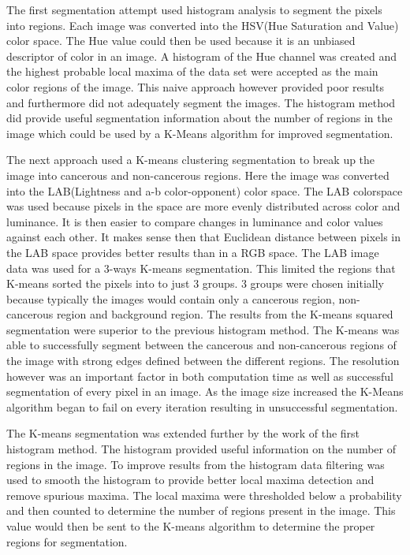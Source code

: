 \documentclass[a4paper,10pt,oneside]{article}
\begin{document}
The first segmentation attempt used histogram analysis to segment the pixels into regions. Each image was converted into the HSV(Hue Saturation and Value) color space. The Hue value could then be used because it is an unbiased descriptor of color in an image. A histogram of the Hue channel was created and the highest probable local maxima of the data set were accepted as the main color regions of the image. This naive approach however provided poor results and furthermore did not adequately segment the images. The histogram method did provide useful segmentation information about the number of regions in the image which could be used by a K-Means algorithm for improved segmentation.

The next approach used a K-means clustering segmentation to break up the image into cancerous and non-cancerous regions. Here the image was converted into the LAB(Lightness and a-b color-opponent) color space. The LAB colorspace was used because pixels in the space are more evenly distributed across color and luminance. It is then easier to compare changes in luminance and color values against each other. It makes sense then that Euclidean distance between pixels in the LAB space provides better results than in a RGB space. The LAB image data was used for a 3-ways K-means segmentation. This limited the regions that K-means sorted the pixels into to just 3 groups. 3 groups were chosen initially because typically the images would contain only a cancerous region, non-cancerous region and background region. The results from the K-means squared segmentation were superior to the previous histogram method. The K-means was able to successfully segment between the cancerous and non-cancerous regions of the image with strong edges defined between the different regions. The resolution however was an important factor in both computation time as well as successful segmentation of every pixel in an image. As the image size increased the K-Means algorithm began to fail on every iteration resulting in unsuccessful segmentation.

The K-means segmentation was extended further by the work of the first histogram method. The histogram provided useful information on the number of regions in the image. To improve results from the histogram data filtering was used to smooth the histogram to provide better local maxima detection and remove spurious maxima. The local maxima were thresholded below a probability and then counted to determine the number of regions present in the image. This value would then be sent to the K-means algorithm to determine the proper regions for segmentation.
\end{document}
